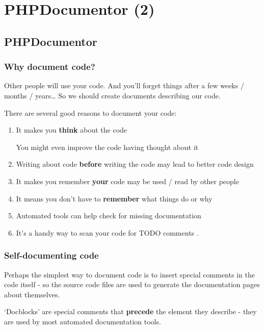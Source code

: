 \documentclass[a4paperpaper,openright]{book}
\begin{document}
\part{PHPDocumentor (2)}

\hypertarget{phpdocumentor}{%
\chapter{PHPDocumentor}\label{phpdocumentor}}

\hypertarget{why-document-code}{%
\section{Why document code?}\label{why-document-code}}

Other people will use your code. And you'll forget things after a few
weeks / months / years\ldots{} So we should create documents describing
our code.

There are several good reasons to document your code:

\begin{enumerate}
\def\labelenumi{\arabic{enumi}.}
\item
  It makes you \textbf{think} about the code

  You might even improve the code having thought about it
\item
  Writing about code \textbf{before} writing the code may lead to better
  code design
\item
  It makes you remember \textbf{your} code may be used / read by other
  people
\item
  It means you don't have to \textbf{remember} what things do or why
\item
  Automated tools can help check for missing documentation
\item
  It's a handy way to scan your code for TODO comments .
\end{enumerate}

\hypertarget{self-documenting-code}{%
\section{Self-documenting code}\label{self-documenting-code}}

Perhaps the simplest way to document code is to insert special comments
in the code itself - so the source code files are used to generate the
documentation pages about themselves.

`Docblocks' are special comments that \textbf{precede} the element they
describe - they are used by most automated documentation tools.
\end{document}
